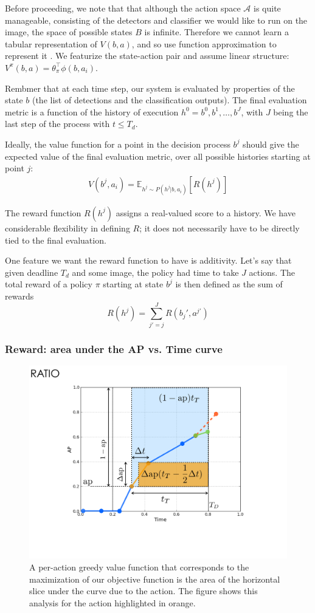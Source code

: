 Before proceeding, we note that that although the action space $\mathcal{A}$ is quite manageable, consisting of the detectors and classifier we would like to run on the image, the space of possible states $B$ is infinite.
Therefore we cannot learn a tabular representation of $V(b,a)$, and so use function approximation to represent it \cite{Sutton1998}.
We featurize the state-action pair and assume linear structure: $V^\pi(b,a) = \theta_\pi^\top  \phi(b,a_i)$.

Rembmer that at each time step, our system is evaluated by properties of the state $b$ (the list of detections and the classification outputs).
The final evaluation metric is a function of the history of execution $h^0=b^0,b^1,\dots,b^J$, with $J$ being the last step of the process with $t \le T_d$.

Ideally, the value function for a point in the decision process $b^j$ should give the expected value of the final evaluation metric, over all possible histories starting at point $j$:
\begin{align}
V(b^j,a_i) = \mathbb{E}_{h^j \sim P(h^j|b,a_i)}[R(h^j)]
\end{align}

The reward function $R(h^j)$ assigns a real-valued score to a history.
We have considerable flexibility in defining $R$; it does not necessarily have to be directly tied to the final evaluation.

One feature we want the reward function to have is additivity.
Let's say that given deadline $T_d$ and some image, the policy had time to take $J$ actions.
The total reward of a policy $\pi$ starting at state $b^j$ is then defined as the sum of rewards
\begin{equation}
R(h^j) = \sum_{j'=j}^J R(b_j',a^{j'})
\end{equation}

\subsubsection{Reward: area under the AP vs. Time curve}
\begin{figure}[htb]
  \centering
  \includegraphics[width=0.56\linewidth]{../figures/apvst_expl.pdf}
  \caption{A per-action greedy value function that corresponds to the maximization of our objective function is the area of the horizontal slice under the curve due to the action. The figure shows this analysis for the action highlighted in orange.}
  \label{fig:rewards}
\end{figure}

